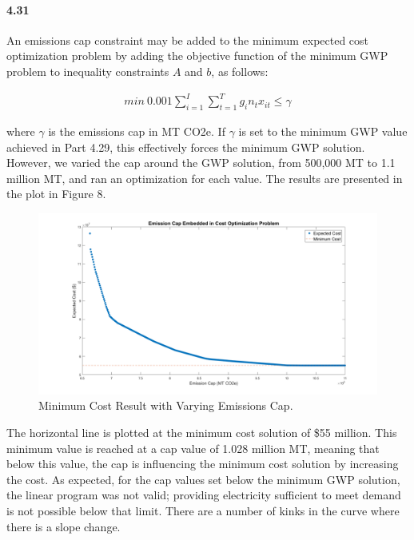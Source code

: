 \documentclass{article}
\begin{document}
\paragraph{4.31}
	An emissions cap constraint may be added to the minimum expected cost optimization problem by adding the objective function of the minimum GWP problem to inequality constraints $A$ and $b$, as follows:
	
	\begin{align*}
		min \ 0.001 \sum_{i=1}^{I} \sum_{t=1}^{T} g_i n_t x_{it} \leq \gamma
	\end{align*}
	
	where $\gamma$ is the emissions cap in MT CO2e. If $\gamma$ is set to the minimum GWP value achieved in Part 4.29, this effectively forces the minimum GWP solution. However, we varied the cap around the GWP solution, from 500,000 MT to 1.1 million MT, and ran an optimization for each value. The results are presented in the plot in Figure 8.
	
	\begin{figure}
		\includegraphics[width=\textwidth]{431_8_cap_figure_plot}
		\caption{Minimum Cost Result with Varying Emissions Cap.}
	\end{figure}

	The horizontal line is plotted at the minimum cost solution of \$55 million. This minimum value is reached at a cap value of 1.028 million MT, meaning that below this value, the cap is influencing the minimum cost solution by increasing the cost. As expected, for the cap values set below the minimum GWP solution, the linear program was not valid; providing electricity sufficient to meet demand is not possible below that limit. There are a number of kinks in the curve where there is a slope change.


\end{document}
